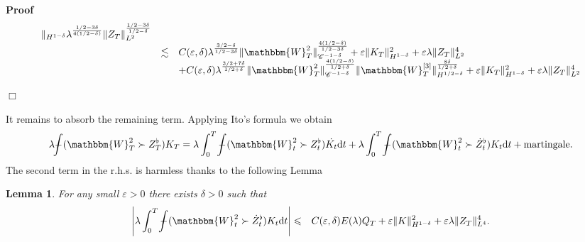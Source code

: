 \documentclass[11pt, oneside]{article}   	%
\newcommand{\mathd}{\mathrm{d}}
\newenvironment{proof}{\noindent\textbf{Proof\ }}{\hspace*{\fill}$\Box$\medskip}
\newtheorem{lemma}{Lemma}
\def\Xint#1{\mathchoice
{\XXint\displaystyle\textstyle{#1}}%
{\XXint\textstyle\scriptstyle{#1}}%
{\XXint\scriptstyle\scriptscriptstyle{#1}}%
{\XXint\scriptscriptstyle\scriptscriptstyle{#1}}%
\!\int}
\def\XXint#1#2#3{{\setbox0=\hbox{$#1{#2#3}{\int}$ }
\vcenter{\hbox{$#2#3$ }}\kern-.6\wd0}}
\def\dashint{\Xint-}
\newcommand{\bint}{\dashint}
\newcommand{\VV}{\mathscr{C}}
\begin{document}
\begin{proof}
\[\begin{array}{lll}
       \|_{H^{1 - \delta}} \lambda^{\frac{1 / 2 - 3 \delta}{4 (1 / 2 -
       \delta)}} \| Z_T \|^{\frac{1 / 2 - 3 \delta}{1 / 2 - \delta}}_{L^2}\\
       & \lesssim & C (\varepsilon, \delta) \lambda^{\frac{3 / 2 - \delta}{1
       / 2 - 3 \delta}} \| \mathbbm{W}^2_T \|^{\frac{4 (1 / 2 - \delta)}{1 / 2
       - 3 \delta}}_{\VV^{- 1 - \delta}} + \varepsilon \| K_T \|^2_{H^{1 -
       \delta}} + \varepsilon \lambda \| Z_T \|^4_{L^2}\\
       &  & + C (\varepsilon, \delta) \lambda^{\frac{3 / 2 + 7 \delta}{1 / 2
       + \delta}} \| \mathbbm{W}^2_T \|^{\frac{4 (1 / 2 - \delta)}{1 / 2 +
       \delta}}_{\VV^{- 1 - \delta}} \| \mathbbm{W}_T^{[3]} \|^{\frac{8
       \delta}{1 / 2 + \delta}}_{H^{1 / 2 - \delta}} + \varepsilon \| K_T
       \|^2_{H^{1 - \delta}} + \varepsilon \lambda \| Z_T \|^4_{L^2}
     \end{array} \]
  
\end{proof}

It remains to absorb the remaining term. Applying Ito's formula we obtain
\[ \lambda \bint (\mathbbm{W}^2_T \succ Z^{\flat}_T) K_T = \lambda \int_0^T
   \bint (\mathbbm{W}^2_t \succ Z^{\flat}_t) \dot{K_t} \mathd t + \lambda
   \int_0^T \bint (\mathbbm{W}^2_t \succ \dot{Z}^{\flat}_t) K_t \mathd t +
   \text{martingale} . \]
The second term in the r.h.s. is harmless thanks to the following Lemma

\begin{lemma}
  For any small $\varepsilon > 0$ there exists $\delta > 0$ such that
  \begin{eqnarray*}
    \left| \lambda \int_0^T \bint (\mathbbm{W}^2_t \succ \dot{Z}^{\flat}_t)
    K_t \mathd t \right| & \leqslant & C (\varepsilon, \delta) E (\lambda) Q_T
    + \varepsilon \| K \|^2_{H^{1 - \delta}} + \varepsilon \lambda \| Z_T
    \|^4_{L^4} .
  \end{eqnarray*}
\end{lemma}
\end{document}
